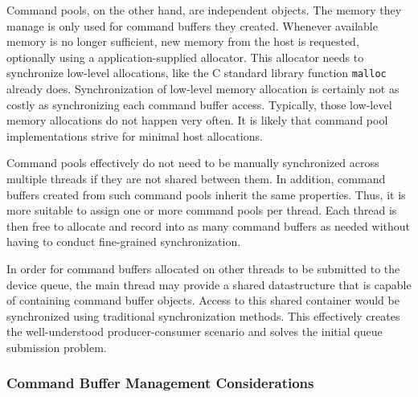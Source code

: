       Command pools, on the other hand, are independent objects.
      The memory they manage is only used for command buffers they created.
      Whenever available memory is no longer sufficient, new memory from the host is requested, optionally using a application-supplied allocator.
      This allocator needs to synchronize low-level allocations, like the C standard library function \lstinline{malloc} already does.
      Synchronization of low-level memory allocation is certainly not as costly as synchronizing each command buffer access.
      Typically, those low-level memory allocations do not happen very often.
      It is likely that command pool implementations strive for minimal host allocations.

      Command pools effectively do not need to be manually synchronized across multiple threads if they are not shared between them.
      In addition, command buffers created from such command pools inherit the same properties.
      Thus, it is more suitable to assign one or more command pools per thread.
      Each thread is then free to allocate and record into as many command buffers as needed without having to conduct fine-grained synchronization.

      In order for command buffers allocated on other threads to be submitted to the device queue, the main thread may provide a shared datastructure that is capable of containing command buffer objects.
      Access to this shared container would be synchronized using traditional synchronization methods.
      This effectively creates the well-understood producer-consumer scenario\cite{EWD:EWD329} and solves the initial queue submission problem.


      \subsubsection{Command Buffer Management Considerations}

